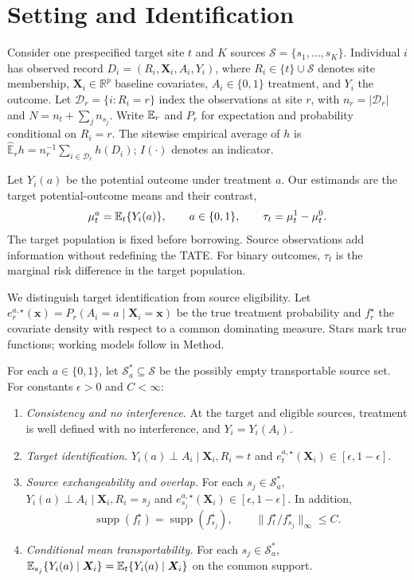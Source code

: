 \documentclass[12pt]{article}
\providecommand{\En}{\widehat{\mathbb E}}
\begin{document}
\section{Setting and Identification}\label{sec:notation}

Consider one prespecified target site $t$ and $K$ sources $\mathcal S=\{s_1,\ldots,s_K\}$. Individual $i$ has observed record $D_i=(R_i,\boldsymbol X_i,A_i,Y_i)$, where $R_i\in\{t\}\cup\mathcal S$ denotes site membership, $\boldsymbol X_i\in\mathbb R^p$ baseline covariates, $A_i\in\{0,1\}$ treatment, and $Y_i$ the outcome. Let $\mathcal D_r=\{i:R_i=r\}$ index the observations at site $r$, with $n_r=|\mathcal D_r|$ and $N=n_t+\sum_jn_{s_j}$. Write $\mathbb{E}_r$ and $P_r$ for expectation and probability conditional on $R_i=r$. The sitewise empirical average of $h$ is $\En_r h=n_r^{-1}\sum_{i\in\mathcal D_r}h(D_i)$; $I(\cdot)$ denotes an indicator.

Let $Y_i(a)$ be the potential outcome under treatment $a$. Our estimands are the target potential-outcome means and their contrast,
\[
\mu_t^a=\mathbb{E}_t\{Y_i(a)\},\qquad a\in\{0,1\},
\qquad \tau_t=\mu_t^1-\mu_t^0.
\]
The target population is fixed before borrowing. Source observations add information without redefining the TATE. For binary outcomes, $\tau_t$ is the marginal risk difference in the target population.

We distinguish target identification from source eligibility. Let $e_r^{a,\star}(\boldsymbol x)=P_r(A_i=a\mid\boldsymbol X_i=\boldsymbol x)$ be the true treatment probability and $f_r^\star$ the covariate density with respect to a common dominating measure. Stars mark true functions; working models follow in Method.

\begin{assumption}\label{asmp:identification}
For each $a\in\{0,1\}$, let $\mathcal S_a^*\subseteq\mathcal S$ be the possibly empty transportable source set. For constants $\epsilon>0$ and $C<\infty$:
\begin{enumerate}[label=(\alph*),ref=\ref{asmp:identification}(\alph*),leftmargin=*]
\item\label{asmp:consistency} \emph{Consistency and no interference.} At the target and eligible sources, treatment is well defined with no interference, and $Y_i=Y_i(A_i)$.
\item\label{asmp:exchangeability} \emph{Target identification.} $Y_i(a)\perp A_i\mid\boldsymbol X_i,R_i=t$ and $e_t^{a,\star}(\boldsymbol X_i)\in[\epsilon,1-\epsilon]$.
\item\label{asmp:positivity} \emph{Source exchangeability and overlap.} For each $s_j\in\mathcal S_a^*$, $Y_i(a)\perp A_i\mid\boldsymbol X_i,R_i=s_j$ and $e_{s_j}^{a,\star}(\boldsymbol X_i)\in[\epsilon,1-\epsilon]$. In addition,
\[
\operatorname{supp}(f_t^\star)=\operatorname{supp}(f_{s_j}^\star),\qquad
\|f_t^\star/f_{s_j}^\star\|_\infty\le C.
\]
\item\label{asmp:transportability} \emph{Conditional mean transportability.} For each $s_j\in\mathcal S_a^*$, $\mathbb{E}_{s_j}\{Y_i(a)\mid\boldsymbol X_i\}=\mathbb{E}_t\{Y_i(a)\mid\boldsymbol X_i\}$ on the common support.
\end{enumerate}
\end{assumption}
\end{document}
